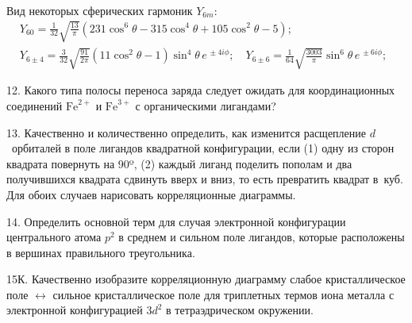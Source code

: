 \\
Вид некоторых сферических гармоник $\textit{Y}_{6m}$:
\begin{equation*}
 \begin{aligned}
&\textit{Y}_{60} =\frac{1}{32}\sqrt{\frac{13}{\pi}}\left(231 \cos^6{\theta}-315\cos^4{\theta}+105\cos^2{\theta}-5 \right); 
\\[6pt]
&\textit{Y}_{6\pm4} =\frac{3}{32}\sqrt{\frac{91}{2\pi}} \left( 11\cos^2{\theta}-1\right) \sin^4 {\theta} \, e^{\,\pm4i\phi}; \quad \textit{Y}_{6\pm6}=\frac{1}{64}\sqrt{\frac{3003}{\pi}} \sin^6 {\theta} \, e^{\,\pm6i\phi};\,\,\quad\quad
 \end{aligned}
\end{equation*}
\par
12. Какого типа полосы переноса заряда следует ожидать для координационных соединений $\text{Fe}^{2+}$ и $\text{Fe}^{3+}$ с органическими лигандами?
\par
13. Качественно и количественно определить, как изменится расщепление $d$~орбиталей в поле лигандов квадратной конфигурации, если (1) одну из сторон квадрата повернуть на 90º, (2) каждый лиганд поделить пополам и два получившихся квадрата сдвинуть вверх и вниз, то есть превратить квадрат в~куб. Для обоих случаев нарисовать корреляционные диаграммы.
\par
14. Определить основной терм для случая электронной конфигурации центрального атома $p^2$ в среднем и сильном поле лигандов, которые расположены в вершинах правильного треугольника.
\par
15К. Качественно изобразите корреляционную диаграмму слабое кристаллическое поле $\leftrightarrow$ сильное кристаллическое поле для триплетных термов иона металла с электронной конфигурацией $3d^2$ в тетраэдрическом окружении.
\par